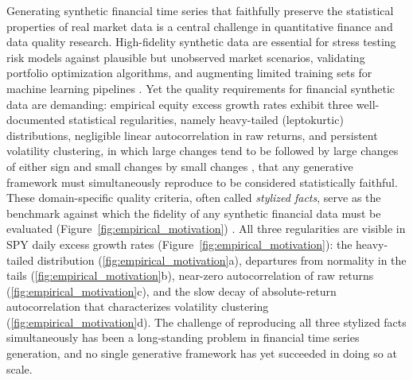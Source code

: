 Generating synthetic financial time series that faithfully preserve the statistical properties of real market data is a central challenge in quantitative finance and data quality research. High-fidelity synthetic data are essential for stress testing risk models against plausible but unobserved market scenarios, validating portfolio optimization algorithms, and augmenting limited training sets for machine learning pipelines \cite{assefa_generating_2021, jordon_synthetic_2022}. Yet the quality requirements for financial synthetic data are demanding: empirical equity excess growth rates exhibit three well-documented statistical regularities, namely heavy-tailed (leptokurtic) distributions, negligible linear autocorrelation in raw returns, and persistent volatility clustering, in which large changes tend to be followed by large changes of either sign and small changes by small changes \cite{mandelbrot_variation_1963}, that any generative framework must simultaneously reproduce to be considered statistically faithful. These domain-specific quality criteria, often called \textit{stylized facts}, serve as the benchmark against which the fidelity of any synthetic financial data must be evaluated (Figure~\ref{fig:empirical_motivation}) \cite{mandelbrot_variation_1963, cont_empirical_2001, stenger_jdiq_ts_synthesis_2024}. All three regularities are visible in SPY daily excess growth rates (Figure~\ref{fig:empirical_motivation}): the heavy-tailed distribution (\ref{fig:empirical_motivation}a), departures from normality in the tails (\ref{fig:empirical_motivation}b), near-zero autocorrelation of raw returns (\ref{fig:empirical_motivation}c), and the slow decay of absolute-return autocorrelation that characterizes volatility clustering (\ref{fig:empirical_motivation}d). The challenge of reproducing all three stylized facts simultaneously has been a long-standing problem in financial time series generation, and no single generative framework has yet succeeded in doing so at scale.


